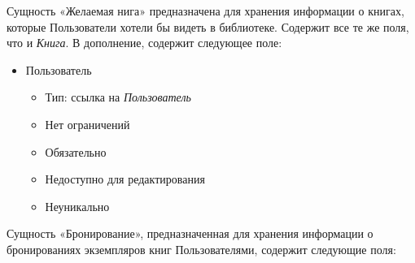 \documentclass[data-specification.tex]{subfiles}
\begin{document}
\par
Сущность «Желаемая нига» предназначена для хранения информации о книгах, которые Пользователи хотели бы видеть в библиотеке. Содержит все те же поля, что и \textsl{Книга}. В дополнение, содержит следующее поле:
\begin{itemize}
    \item Пользователь
    \begin{itemize}
        \item Тип: ссылка на \textsl{Пользователь}
        \item Нет ограничений
        \item Обязательно
        \item Недоступно для редактирования
        \item Неуникально
    \end{itemize}
\end{itemize}
\par
Сущность «Бронирование», предназначенная для хранения информации о бронированиях экземпляров книг Пользователями, содержит следующие поля:
\end{document}
